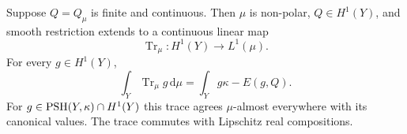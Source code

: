 \begin{lemma}\label{lem:continuous-potential-measure-trace}
Suppose $Q=Q_\mu$ is finite and continuous. Then $\mu$ is non-polar, $Q\in H^1(Y)$, and smooth restriction extends to a continuous linear map
\[
 \operatorname{Tr}_\mu:H^1(Y)\longrightarrow L^1(\mu).
\]
For every $g\in H^1(Y)$,
\begin{equation}\label{eq:continuous-potential-trace}
 \int_Y\operatorname{Tr}_\mu g\,\mathrm d\mu
 =\int_Yg\kappa-E(g,Q).
\end{equation}
For $g\in\mathrm{PSH}(Y,\kappa)\cap H^1(Y)$ this trace agrees $\mu$-almost everywhere with its canonical values. The trace commutes with Lipschitz real compositions.
\end{lemma}
